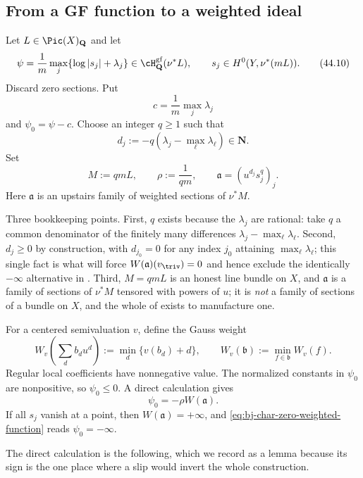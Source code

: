 \subsection{From a GF function to a weighted ideal}
\label{sec:ch44-encoding-ideal}

Let $L\in\Pic(X)_{\mathbf Q}$ and let
\[
 \psi=\frac1m\max_j\{\log|s_j|+\lambda_j\}
          \in\cH^{\mathrm{gf}}_{\mathbf Q}(\nu^*L),
 \qquad
 s_j\in H^0(Y,\nu^*(mL)).
\tag{44.10}\label{eq:bj-char-zero-gf}
\]
Discard zero sections.
Put
\[
                         c=\frac1m\max_j\lambda_j
\]
and $\psi_0=\psi-c$.
Choose an integer $q\ge1$ such that
\[
                 d_j:=-q(\lambda_j-\max_\ell\lambda_\ell)
                         \in\mathbf N.
\tag{44.11}\label{eq:bj-char-zero-weight-exponents}
\]
Set
\[
            M:=qmL,
            \qquad
            \rho:=\frac1{qm},
            \qquad
            \mathfrak a=(u^{d_j}s_j^q)_j.
\tag{44.12}\label{eq:bj-char-zero-weighted-ideal}
\]
Here $\mathfrak a$ is an upstairs family of weighted sections of
$\nu^*M$.

Three bookkeeping points.  First, $q$ exists because the $\lambda_j$ are
rational: take $q$ a common denominator of the finitely many differences
$\lambda_j-\max_\ell\lambda_\ell$.  Second, $d_j\ge0$ by construction,
with $d_{j_0}=0$ for any index $j_0$ attaining
$\max_\ell\lambda_\ell$; this single fact is what will force
$W(\mathfrak a)(v_\triv)=0$ and hence exclude the identically
$-\infty$ alternative in .  Third, $M=qmL$ is
an honest line bundle on $X$, and $\mathfrak a$ is a family of sections
of $\nu^*M$ tensored with powers of $u$; it is \emph{not} a family of
sections of a bundle on $X$, and the whole of
 exists to manufacture one.

For a centered semivaluation $v$, define the Gauss weight
\[
 W_v\left(\sum_d b_du^d\right)
       :=\min_d\{v(b_d)+d\},
 \qquad
 W_v(\mathfrak b):=\min_{f\in\mathfrak b}W_v(f).
\tag{44.13}\label{eq:bj-char-zero-gauss-weight}
\]
Regular local coefficients have nonnegative value.
The normalized constants in $\psi_0$ are nonpositive, so
$\psi_0\le0$.
A direct calculation gives
\[
                         \psi_0=-\rho W(\mathfrak a).
\tag{44.14}\label{eq:bj-char-zero-weighted-function}
\]
If all $s_j$ vanish at a point, then $W(\mathfrak a)=+\infty$, and
\eqref{eq:bj-char-zero-weighted-function} reads $\psi_0=-\infty$.

The direct calculation is the following, which we record as a lemma because
its sign is the one place where a slip would invert the whole construction.

